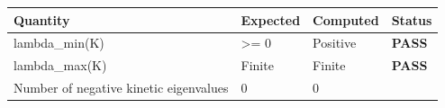 \documentclass[
  11pt,
]{article}
\begin{document}
\begin{longtable}[]{@{}llll@{}}
\toprule
\begin{minipage}[b]{0.22\columnwidth}\raggedright
Quantity\strut
\end{minipage} & \begin{minipage}[b]{0.22\columnwidth}\raggedright
Expected\strut
\end{minipage} & \begin{minipage}[b]{0.22\columnwidth}\raggedright
Computed\strut
\end{minipage} & \begin{minipage}[b]{0.22\columnwidth}\raggedright
Status\strut
\end{minipage}\tabularnewline
\midrule
\endhead
\begin{minipage}[t]{0.22\columnwidth}\raggedright
lambda\_min(K)\strut
\end{minipage} & \begin{minipage}[t]{0.22\columnwidth}\raggedright
\textgreater= 0\strut
\end{minipage} & \begin{minipage}[t]{0.22\columnwidth}\raggedright
Positive\strut
\end{minipage} & \begin{minipage}[t]{0.22\columnwidth}\raggedright
\textbf{PASS}\strut
\end{minipage}\tabularnewline
\begin{minipage}[t]{0.22\columnwidth}\raggedright
lambda\_max(K)\strut
\end{minipage} & \begin{minipage}[t]{0.22\columnwidth}\raggedright
Finite\strut
\end{minipage} & \begin{minipage}[t]{0.22\columnwidth}\raggedright
Finite\strut
\end{minipage} & \begin{minipage}[t]{0.22\columnwidth}\raggedright
\textbf{PASS}\strut
\end{minipage}\tabularnewline
\begin{minipage}[t]{0.22\columnwidth}\raggedright
Number of negative kinetic eigenvalues\strut
\end{minipage} & \begin{minipage}[t]{0.22\columnwidth}\raggedright
0\strut
\end{minipage} & \begin{minipage}[t]{0.22\columnwidth}\raggedright
0\strut
\end{minipage} & \begin{minipage}[t]{0.22\columnwidth}\raggedright

\end{minipage}
\end{longtable}
\end{document}
